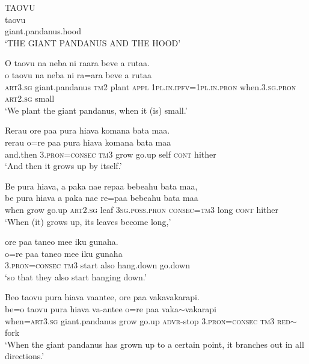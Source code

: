 \ea\label{ex:text10-1}
TAOVU\\
\gll taovu\\
     giant.pandanus.hood\\
\glt `THE GIANT PANDANUS AND THE HOOD'
\z

\ea\label{ex:text10-2}
O taovu na neba ni raara beve a rutaa.\\
\gll o	taovu	na	neba	ni	ra=ara	beve	a	rutaa\\
     \textsc{art}3.\textsc{sg}	giant.pandanus	\textsc{tm}2	plant	\textsc{appl}	1\textsc{pl}.\textsc{in}.\textsc{ipfv}=1\textsc{pl}.\textsc{in}.\textsc{pron}	when.3.\textsc{sg}.\textsc{pron}	\textsc{art}2.\textsc{sg}	small\\
\glt `We plant the giant pandanus, when it (is) small.'
\z

\ea\label{ex:text10-3}
Rerau ore paa pura hiava komana bata maa.\\
\gll rerau	o=re	paa	pura	hiava	komana	bata	maa\\
     and.then	3.\textsc{pron}=\textsc{consec}	\textsc{tm}3	grow	go.up	self	\textsc{cont}	hither\\
\glt `And then it grows up by itself.'
\z

\ea\label{ex:text10-4}
Be pura hiava, a paka nae repaa bebeahu bata maa,\\
\gll be	pura	hiava	a	paka	nae	re=paa	bebeahu	bata	maa\\
     when	grow	go.up	\textsc{art}2.\textsc{sg}	leaf	3\textsc{sg}.\textsc{poss}.\textsc{pron}	\textsc{consec}=\textsc{tm}3	long	\textsc{cont}	hither\\
\glt `When (it) grows up, its leaves become long,'
\z

\ea\label{ex:text10-5}
ore paa taneo mee iku gunaha.\\
\gll o=re	paa	taneo	mee	iku	gunaha\\
     3.\textsc{pron}=\textsc{consec}	\textsc{tm}3	start	also	hang.down	go.down\\
\glt `so that they also start hanging down.'
\z

\ea\label{ex:text10-6}
Beo taovu pura hiava vaantee, ore paa vakavakarapi.\\
\gll be=o	taovu	pura	hiava	va-antee	o=re	paa	vaka{$\sim$}vakarapi\\
     when=\textsc{art}3.\textsc{sg}	giant.pandanus	grow	go.up	\textsc{advr}-stop	3.\textsc{pron}=\textsc{consec}	\textsc{tm}3	\textsc{red}{$\sim$}fork\\
\glt `When the giant pandanus has grown up to a certain point, it branches out in all directions.'
\z

